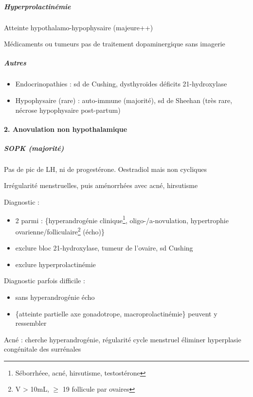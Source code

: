 \documentclass[11pt]{article}
\begin{document}
\subparagraph{Hyperprolactinémie}
\label{sec:org48ef7af}
Atteinte hypothalamo-hypophysaire (majeure++)

Médicaments ou tumeurs \thus pas de traitement dopaminergique sans imagerie \danger

\subparagraph{Autres}
\label{sec:orgc15c04c}
\begin{itemize}
\item Endocrinopathies : sd de Cushing, dysthyroïdes déficits 21-hydroxylase
\item Hypophysaire (rare) : auto-immune (majorité), sd de Sheehan (très rare, nécrose hypophysaire post-partum)
\end{itemize}

\paragraph{2. Anovulation non hypothalamique}
\label{sec:org4cf750a}
\subparagraph{SOPK (majorité)}
\label{sec:org5aca36f}
Pas de pic de LH, ni de progestérone. Oestradiol mais non cycliques

Irrégularité menstruelles, puis aménorrhées avec acné, hirsutisme

Diagnostic :
\begin{itemize}
\item 2 parmi : \{hyperandrogénie clinique\footnote{Séborrhéee, acné, hirsutisme, \inc testostérone}, oligo-/a-novulation, hypertrophie
ovarienne/folliculaire\footnote{V > 10mL, \(\ge\) 19 follicule par ovaires} (écho)\}
\item exclure bloc 21-hydroxylase, tumeur de l'ovaire, sd Cushing
\item exclure hyperprolactinémie
\end{itemize}

Diagnostic parfois difficile :
\begin{itemize}
\item sans hyperandrogénie \thus écho
\item \{atteinte partielle axe gonadotrope, macroprolactinémie\} peuvent y ressembler
\end{itemize}

Acné : cherche hyperandrogénie, régularité cycle menstruel \thus éliminer
hyperplasie congénitale des surrénales
\end{document}
